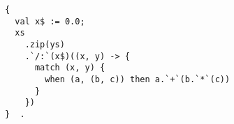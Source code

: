 \begin{minipage}{\linewidth}
\begin{lstlisting}[mathescape=false]
{ 
  val x$ := 0.0; 
  xs
    .zip(ys)
    .`/:`(x$)((x, y) -> {
      match (x, y) {
        when (a, (b, c)) then a.`+`(b.`*`(c))
      }
    })
}  . 
\end{lstlisting}
\end{minipage}










